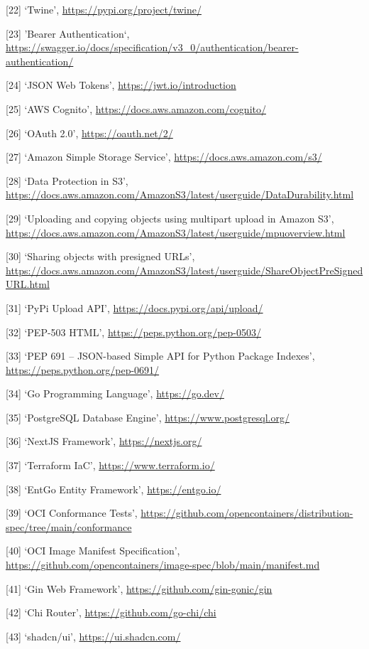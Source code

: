 \documentclass{article}
\begin{document}
  [22] `Twine', \url{https://pypi.org/project/twine/}
  
  [23] 'Bearer Authentication`, \url{https://swagger.io/docs/specification/v3_0/authentication/bearer-authentication/}

  [24] `JSON Web Tokens', \url{https://jwt.io/introduction}

  [25] `AWS Cognito', \url{https://docs.aws.amazon.com/cognito/}

  [26] `OAuth 2.0', \url{https://oauth.net/2/}

  [27] `Amazon Simple Storage Service', \url{https://docs.aws.amazon.com/s3/}

  [28] `Data Protection in S3', \url{https://docs.aws.amazon.com/AmazonS3/latest/userguide/DataDurability.html}

  [29] `Uploading and copying objects using multipart upload in Amazon S3', \url{https://docs.aws.amazon.com/AmazonS3/latest/userguide/mpuoverview.html}

  [30] `Sharing objects with presigned URLs', \url{https://docs.aws.amazon.com/AmazonS3/latest/userguide/ShareObjectPreSignedURL.html}

  [31] `PyPi Upload API', \url{https://docs.pypi.org/api/upload/}

  [32] `PEP-503 HTML', \url{https://peps.python.org/pep-0503/}

  [33] `PEP 691 – JSON-based Simple API for Python Package Indexes', \url{https://peps.python.org/pep-0691/}
  
  [34] `Go Programming Language', \url{https://go.dev/}

  [35] `PostgreSQL Database Engine', \url{https://www.postgresql.org/}

  [36] `NextJS Framework', \url{https://nextjs.org/}

  [37] `Terraform IaC', \url{https://www.terraform.io/}

  [38] `EntGo Entity Framework', \url{https://entgo.io/}

  [39] `OCI Conformance Tests', \url{https://github.com/opencontainers/distribution-spec/tree/main/conformance}

  [40] `OCI Image Manifest Specification', \url{https://github.com/opencontainers/image-spec/blob/main/manifest.md}

  [41] `Gin Web Framework', \url{https://github.com/gin-gonic/gin}

  [42] `Chi Router', \url{https://github.com/go-chi/chi}

  [43] `shadcn/ui', \url{https://ui.shadcn.com/}
\end{document}
